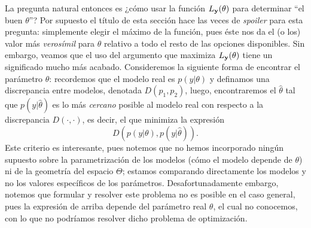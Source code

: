 La pregunta  natural entonces es ¿cómo usar la función $L_{\mathbf{y}}(\theta)$ para determinar ``el buen $\theta$''? Por supuesto el título de esta sección hace las veces de \emph{spoiler} para esta pregunta: simplemente elegir el máximo de la función, pues éste nos da el (o los) valor más \emph{verosímil} para $\theta$ relativo a todo el resto de las opciones disponibles. Sin embargo, veamos que el uso del argumento que maximiza $L_{\mathbf{y}}(\theta)$ tiene un significado  mucho más  acabado. Consideremos la siguiente forma de encontrar el parámetro $\theta$: recordemos que el  modelo real es $p(y|\theta)$ y definamos una discrepancia entre modelos, denotada $D(p_1,p_2)$, luego, encontraremos el $\hat\theta$ tal que $p(y|\hat\theta)$ es lo más \emph{cercano} posible al modelo real con respecto a la discrepancia $D(\cdot,\cdot)$, es decir, el que minimiza la expresión
\begin{equation}
    	D(p(y|\theta),p(y|\hat\theta)).
\end{equation}  
Este criterio es interesante, pues notemos que no hemos incorporado ningún supuesto sobre la parametrización de  los  modelos (cómo el  modelo depende de $\theta$) ni de la  geometría del espacio  $\Theta$; estamos comparando directamente los modelos y no los  valores específicos de los parámetros. Desafortunadamente embargo, notemos que formular y resolver  este problema no es posible en el caso general, pues la expresión de arriba depende del parámetro real $\theta$, el cual no conocemos, con lo que no podríamos resolver dicho problema de optimización. 

